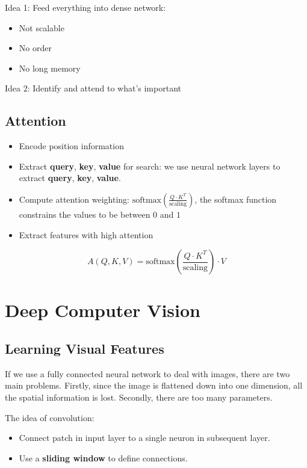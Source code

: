 \documentclass[12pt, a4paper, oneside]{article}
\begin{document}
Idea 1: Feed everything into dense network:
\begin{itemize}
    \item Not scalable
    \item No order
    \item No long memory
\end{itemize}

Idea 2: Identify and attend to what's important

\subsection{Attention}

\begin{itemize}
    \item Encode position information
    \item Extract \textbf{query}, \textbf{key}, \textbf{value} for search: we use neural network layers to extract \textbf{query}, \textbf{key}, \textbf{value}.
    \item Compute attention weighting: $\text{softmax}(\frac{Q\cdot K^{T}}{\text{scaling}})$, the softmax function constrains the values to be between $0$ and $1$
    \item Extract features with high attention
\end{itemize}

\begin{equation*}
    A(Q,K,V)=\text{softmax}(\frac{Q\cdot K^{T}}{\text{scaling}})\cdot V
\end{equation*}

\section{Deep Computer Vision}

\subsection{Learning Visual Features}

If we use a fully connected neural network to deal with images, there are two main problems. Firstly, since the image is flattened down into one dimension, all the spatial information is lost. Secondly, there are too many parameters.

The idea of convolution:
\begin{itemize}
    \item Connect patch in input layer to a single neuron in subsequent layer.
    \item Use a \textbf{sliding window} to define connections.
\end{itemize}
\end{document}
